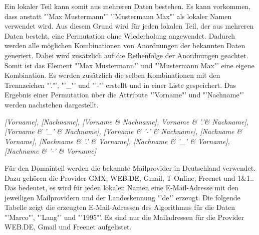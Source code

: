 	Ein lokaler Teil kann somit aus mehreren Daten bestehen. Es kann vorkommen, dass anstatt "'Max Mustermann"' "'Mustermann Max"' als lokaler Namen verwendet wird. Aus diesem Grund wird für jeden lokalen Teil, der aus mehreren Daten besteht, eine Permutation ohne Wiederholung angewendet. Dadurch werden alle möglichen Kombinationen von Anordnungen der bekannten Daten generiert. Dabei wird zusätzlich auf die Reihenfolge der Anordnungen geachtet. Somit ist das Element "'Max Mustermann"' und "'Mustermann Max"' eine eigene Kombination. Es werden zusätzlich die selben Kombinationen mit den Trennzeichen "'."', "'\_"' und "'-"' erstellt und in einer Liste gespeichert. Das Ergebnis einer Permutation über die Attribute "'Vorname"' und "'Nachname"' werden nachstehen dargestellt.
	
	\textit{[Vorname], [Nachname], [Vorname \& Nachname], Vorname \& '.'\& Nachname], [Vorname \& '\_' \& Nachname], [Vorname \& '-' \& Nachname], [Nachname \& Vorname], [Nachname \& '.' \& Vorname], [Nachname \& '\_' \& Vorname], [Nachname \& '-' \& Vorname]}
	
	Für den Domainteil werden die bekannte Mailprovider in Deutschland verwendet. Dazu gehören die Provider GMX, WEB.DE, Gmail, T-Online, Freenet und 1\&1.\cite{AnbieterMail}. Das bedeutet, es wird für jeden lokalen Namen eine E-Mail-Adresse mit den jeweiligen Mailprovidern und der Landeskennung "'de"' erzeugt. Die folgende Tabelle  zeigt die erzeugten E-Mail-Adressen des Algorithmus für die Daten "'Marco"', "'Lang"' und "'1995"'. Es sind nur die Mailadressen für die Provider WEB.DE, Gmail und Freenet aufgelistet.
	
